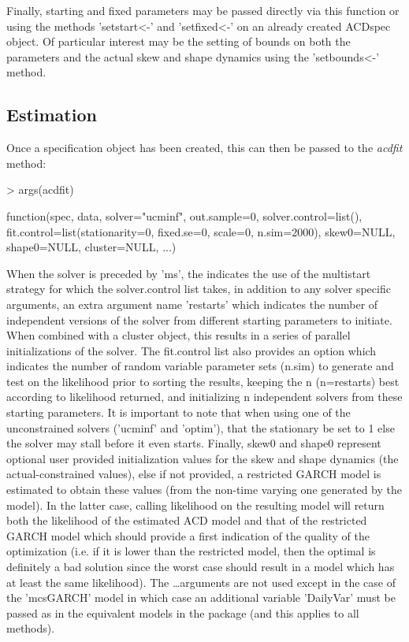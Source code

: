 Finally, starting and fixed parameters may be passed directly via this function or using the methods 'setstart<-' and 'setfixed<-' on an already created ACDspec object. Of particular interest may be the setting of bounds on both the parameters and the actual skew and shape dynamics using the 'setbounds<-' method.
\subsection{Estimation}
Once a specification object has been created, this can then be passed to the \emph{acdfit} method:
\begin{Schunk}
\begin{Sinput}
> args(acdfit)
\end{Sinput}
\begin{Soutput}
function(spec, data, solver="ucminf", out.sample=0, solver.control=list(),
fit.control=list(stationarity=0, fixed.se=0, scale=0, n.sim=2000),
skew0=NULL, shape0=NULL, cluster=NULL, ...)
\end{Soutput}
\end{Schunk}
When the solver is preceded by 'ms', the indicates the use of the multistart strategy for which the solver.control list takes, in addition to any solver specific arguments, an extra argument name 'restarts' which indicates the number of independent versions of the solver from different starting parameters to initiate. When combined with a cluster object, this results in a series of parallel initializations of the solver. The fit.control list also provides an option which indicates the number of random variable parameter sets (n.sim) to generate and test on the likelihood prior to sorting the results, keeping the n (n=restarts) best according to likelihood returned, and initializing n independent solvers from these starting parameters. It is important to note that when using one of the unconstrained solvers ('ucminf' and 'optim'), that the stationary be set to 1 else the solver may stall before it even starts. Finally, skew0 and shape0 represent optional user provided initialization values for the skew and shape dynamics (the actual-constrained values), else if not provided, a restricted GARCH model is estimated to obtain these values (from the non-time varying one generated by the model). In the latter case, calling likelihood on the resulting model will return both the likelihood of the estimated ACD model and that of the restricted GARCH model which should provide a first indication of the quality of the optimization (i.e. if it is lower than the restricted model, then the optimal is definitely a bad solution since the worst case should result in a model which has at least the same likelihood). The \dots arguments are not used except in the case of the 'mcsGARCH' model in which case an additional variable 'DailyVar' must be passed as in the equivalent models in the \verb@rugarch@ package (and this applies to all methods).\\
